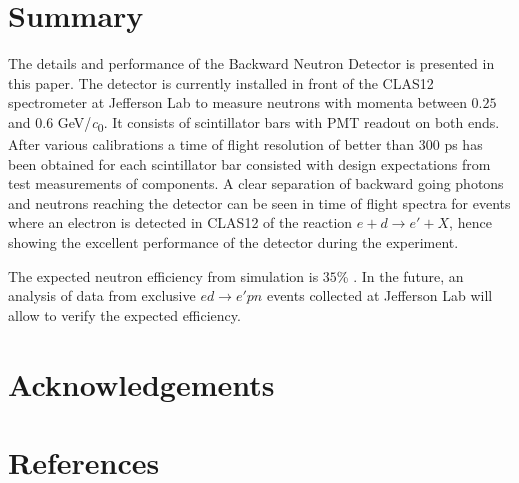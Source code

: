 \documentclass[3p,final,twocolumn]{elsarticle}
\begin{document}
{%

\section{Summary}
The details and performance of the Backward Neutron Detector is presented in this paper. The detector is currently installed in front of the CLAS12 spectrometer at Jefferson Lab to measure neutrons with momenta between $0.25$ and $0.6$ \si{\GeV/\clight}.  It consists of scintillator bars with PMT readout on both ends.
After various calibrations a time of flight resolution of better than 300 \si{\pico\s} has been obtained for each scintillator bar consisted with design expectations from test measurements of components. A clear separation of backward going photons and neutrons reaching the detector can be seen in time of flight spectra for events where an electron is detected in CLAS12 of the reaction $e+d \rightarrow e'+X$, hence showing the excellent performance of the detector during the experiment.

The expected neutron efficiency from simulation is $35$\% . In the future, an analysis of data from exclusive $ed \rightarrow e'pn$ events collected at Jefferson Lab will allow to verify the expected efficiency.


\section{Acknowledgements}



\section*{References}



\clearpage




}
\end{document}

